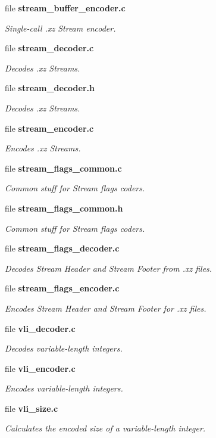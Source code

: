 \begin{DoxyCompactItemize}
file {\bf stream\-\_\-buffer\-\_\-encoder.\-c}
\begin{DoxyCompactList}\small\item\em Single-\/call .xz Stream encoder. \end{DoxyCompactList}\item 
file {\bf stream\-\_\-decoder.\-c}
\begin{DoxyCompactList}\small\item\em Decodes .xz Streams. \end{DoxyCompactList}\item 
file {\bf stream\-\_\-decoder.\-h}
\begin{DoxyCompactList}\small\item\em Decodes .xz Streams. \end{DoxyCompactList}\item 
file {\bf stream\-\_\-encoder.\-c}
\begin{DoxyCompactList}\small\item\em Encodes .xz Streams. \end{DoxyCompactList}\item 
file {\bf stream\-\_\-flags\-\_\-common.\-c}
\begin{DoxyCompactList}\small\item\em Common stuff for Stream flags coders. \end{DoxyCompactList}\item 
file {\bf stream\-\_\-flags\-\_\-common.\-h}
\begin{DoxyCompactList}\small\item\em Common stuff for Stream flags coders. \end{DoxyCompactList}\item 
file {\bf stream\-\_\-flags\-\_\-decoder.\-c}
\begin{DoxyCompactList}\small\item\em Decodes Stream Header and Stream Footer from .xz files. \end{DoxyCompactList}\item 
file {\bf stream\-\_\-flags\-\_\-encoder.\-c}
\begin{DoxyCompactList}\small\item\em Encodes Stream Header and Stream Footer for .xz files. \end{DoxyCompactList}\item 
file {\bf vli\-\_\-decoder.\-c}
\begin{DoxyCompactList}\small\item\em Decodes variable-\/length integers. \end{DoxyCompactList}\item 
file {\bf vli\-\_\-encoder.\-c}
\begin{DoxyCompactList}\small\item\em Encodes variable-\/length integers. \end{DoxyCompactList}\item 
file {\bf vli\-\_\-size.\-c}
\begin{DoxyCompactList}\small\item\em Calculates the encoded size of a variable-\/length integer. \end{DoxyCompactList}\end{DoxyCompactItemize}
